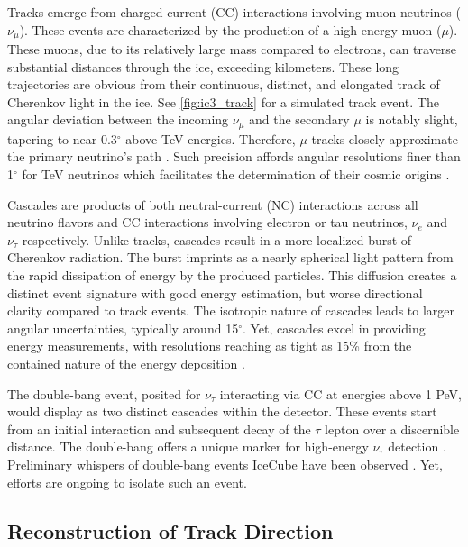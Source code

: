 Tracks emerge from charged-current (CC) interactions involving muon neutrinos ($\nu_\mu$).
These events are characterized by the production of a high-energy muon ($\mu$).
These muons, due to its relatively large mass compared to electrons, can traverse substantial distances through the ice, exceeding kilometers.
These long trajectories are obvious from their continuous, distinct, and elongated track of Cherenkov light in the ice.
See \cref{fig:ic3_track} for a simulated track event.
The angular deviation between the incoming $\nu_\mu$ and the secondary $\mu$ is notably slight, tapering to near 0.3$^\circ$ above TeV energies.
Therefore, $\mu$ tracks closely approximate the primary neutrino's path \cite{physics_withIC3,IC3_energyReco}.
Such precision affords angular resolutions finer than 1$^\circ$ for TeV neutrinos which facilitates the determination of their cosmic origins \cite{physics_withIC3}.

Cascades are products of both neutral-current (NC) interactions across all neutrino flavors and CC interactions involving electron or tau neutrinos, $\nu_e$ and $\nu_\tau$ respectively.
Unlike tracks, cascades result in a more localized burst of Cherenkov radiation.
The burst imprints as a nearly spherical light pattern from the rapid dissipation of energy by the produced particles.
This diffusion creates a distinct event signature with good energy estimation, but worse directional clarity compared to track events.
The isotropic nature of cascades leads to larger angular uncertainties, typically around 15$^\circ$.
Yet, cascades excel in providing energy measurements, with resolutions reaching as tight as 15\% from the contained nature of the energy deposition \cite{physics_withIC3,IC3_energyReco}.

The double-bang event, posited for $\nu_\tau$ interacting via CC at energies above 1 PeV, would display as two distinct cascades within the detector.
These events start from an initial interaction and subsequent decay of the $\tau$ lepton over a discernible distance.
The double-bang offers a unique marker for high-energy $\nu_\tau$ detection \cite{physics_withIC3}.
Preliminary whispers of double-bang events IceCube have been observed \cite{IC3_taus}.
Yet, efforts are ongoing to isolate such an event.

\subsection{Reconstruction of Track Direction}


